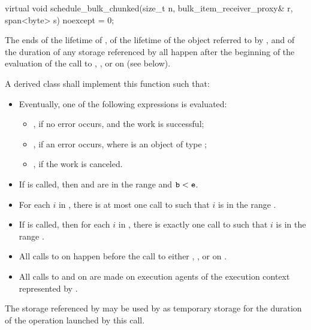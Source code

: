 %
\begin{itemdecl}
virtual void schedule_bulk_chunked(size_t n, bulk_item_receiver_proxy& r,
                                   span<byte> s) noexcept = 0;
\end{itemdecl}

\begin{itemdescr}
\pnum
\expects
The ends
of the lifetime of ,
of the lifetime of the object referred to by , and
of the duration of any storage referenced by 
all happen after
the beginning of the evaluation of the call to
, , or 
on  (see below).

\pnum
\effects
A derived class shall implement this function such that:
\begin{itemize}
\item
Eventually, one of the following expressions is evaluated:
\begin{itemize}
\item
{}, if no error occurs, and the work is successful;
\item
{}, if an error occurs,
where  is an object of type ;
\item
{}, if the work is canceled.
\end{itemize}
\item
If  is called,
then  and  are in the range  and
$\tcode{b} < \tcode{e}$.
\item
For each $i$ in ,
there is at most one call to 
such that $i$ is in the range .
\item
If  is called,
then for each $i$ in ,
there is exactly one call to 
such that $i$ is in the range .
\item
All calls to  on  happen before
the call to either , , or 
on .
\item
All calls to  and  on  are made
on execution agents of the execution context represented by .
\end{itemize}

\pnum
\remarks
The storage referenced by  may be used by 
as temporary storage for the duration of the operation launched by this call.
\end{itemdescr}

